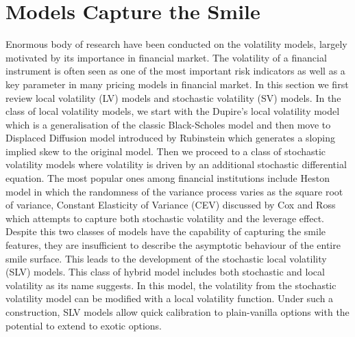 
\chapter{Models Capture the Smile} %

\label{Chapter4} %

Enormous body of research have been conducted on the volatility models, largely motivated by its importance in financial market. The volatility of a financial instrument is often seen as one of the most important risk indicators as well as a key parameter in many pricing models in financial market. In this section we first review local volatility (LV) models and stochastic volatility (SV) models. In the class of  local volatility models, we start with the Dupire's local volatility model which is a generalisation of the classic Black-Scholes model \parencite{bs1973} and then move to Displaced Diffusion model introduced by Rubinstein \parencite{displaced_process} which generates a sloping implied skew to the original model. Then we proceed to a class of stochastic volatility models where volatility is driven by an additional stochastic differential equation. The most popular ones among financial institutions include Heston model \parencite{Heston1993ACS} in which the randomness of the variance process varies as the square root of variance, Constant Elasticity of Variance (CEV) discussed by Cox and Ross \parencite{cox1975notes} which attempts to capture both stochastic volatility and the leverage effect.   Despite this two classes of models have the capability of capturing the smile features, they are insufficient to describe the asymptotic behaviour of the entire smile surface. This leads to the development of the stochastic local volatility (SLV) models. This class of hybrid model includes both stochastic and local volatility as its name suggests. In this model, the volatility from the stochastic volatility model can be modified with a local volatility function. Under such a construction, SLV models allow quick calibration to plain-vanilla options with the potential to extend to exotic options. 



